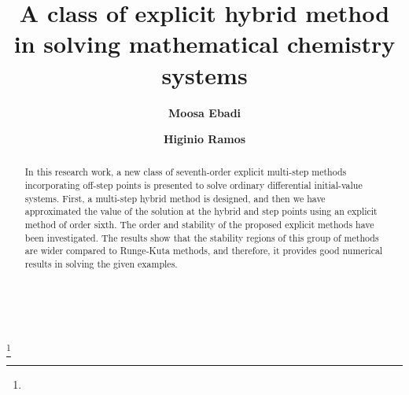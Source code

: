 ‎\documentclass[a4paper,10pt]{article}‎
\begin{document}
\title[Explicit  Hybrid Method ]{\bf A class of explicit  hybrid method in solving mathematical chemistry systems}
\vspace{.1 cm}
\author[  1 ]{\bf Moosa Ebadi}
\author[  2 ]{\bf  Higinio Ramos }
\address{\small{\hfill\break Department of Mathematics Education,  University of Farhangian, P.O. Box: 14665-889, Tehran, Iran.}\\
\small{\hfill\break
 Scientific Computing Group, Universidad de Salamanca, Plaza de la Merced, 37008 Salamanca, Spain}}
\date{}
\thanks{}
\vspace{1cm}
\vspace{1cm}
\begin{abstract}
 In this research work, a new class of seventh-order explicit multi-step methods  incorporating off-step points is presented  to solve ordinary differential initial-value systems. First, a multi-step hybrid method is designed, and then we have approximated the value of the solution at the hybrid and step points using an explicit method of order sixth. The order and stability of the proposed explicit methods have been investigated. The results show that the stability regions of this group of methods are wider compared to Runge-Kuta methods, and therefore, it provides good numerical results in solving the given examples.
 \end{abstract}
\maketitle {}
\end{document}
